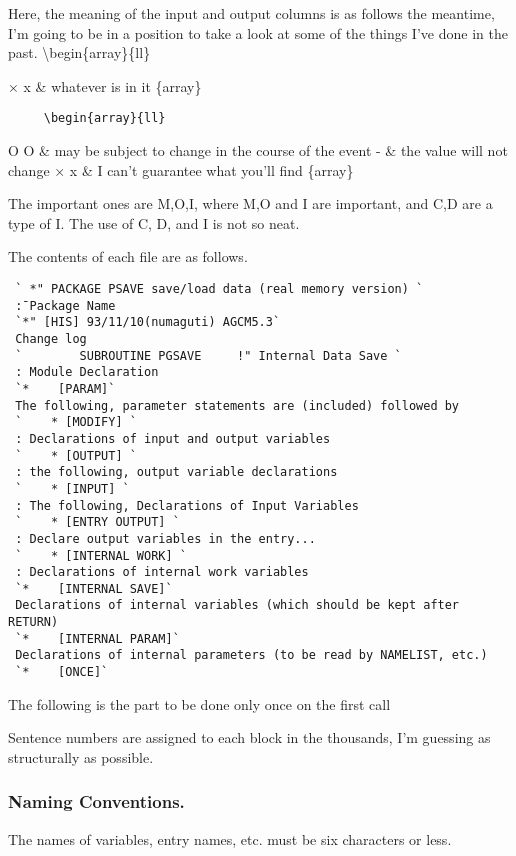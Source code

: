 Here, the meaning of the input and output columns is as follows \In the
meantime, I'm going to be in a position to take a look at some of the
things I've done in the past. \textbackslash begin\{array\}\{ll\}

× x \& whatever is in it \{array\}

\begin{verbatim}
     \begin{array}{ll}   
\end{verbatim}

O O \& may be subject to change in the course of the event - \& the
value will not change × x \& I can't guarantee what you'll find
\{array\}

The important ones are M,O,I, where M,O and I are important, and C,D are
a type of I. The use of C, D, and I is not so neat.

The contents of each file are as follows.

\begin{verbatim}
 ` *" PACKAGE PSAVE save/load data (real memory version) ` 
 :̄ Package Name 
 `*" [HIS] 93/11/10(numaguti) AGCM5.3` 
 Change log 
 `        SUBROUTINE PGSAVE     !" Internal Data Save ` 
 : Module Declaration 
 `*    [PARAM]` 
 The following, parameter statements are (included) followed by 
 `    * [MODIFY] ` 
 : Declarations of input and output variables 
 `    * [OUTPUT] ` 
 : the following, output variable declarations 
 `    * [INPUT] ` 
 : The following, Declarations of Input Variables 
 `    * [ENTRY OUTPUT] ` 
 : Declare output variables in the entry... 
 `    * [INTERNAL WORK] ` 
 : Declarations of internal work variables 
 `*    [INTERNAL SAVE]` 
 Declarations of internal variables (which should be kept after RETURN) 
 `*    [INTERNAL PARAM]` 
 Declarations of internal parameters (to be read by NAMELIST, etc.) 
 `*    [ONCE]` 
\end{verbatim}

The following is the part to be done only once on the first call

Sentence numbers are assigned to each block in the thousands, I'm
guessing as structurally as possible.

\hypertarget{naming-conventions.}{%
\subsubsection{Naming Conventions.}\label{naming-conventions.}}

The names of variables, entry names, etc. must be six characters or
less.


